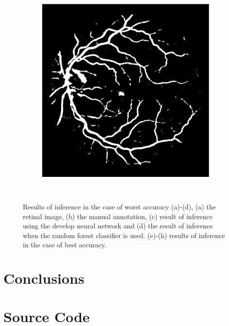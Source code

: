 \documentclass[aps,prb,10pt,twocolumn,groupedaddress]{revtex4-1}
\begin{document}
\begin{figure}[!t]
\begin{subfigure}[]{0.22\textwidth}
		\caption{}
	\end{subfigure}
	\hspace{0.25cm}
	\centering
	\begin{subfigure}[]{0.22\textwidth}
		\centering
		\includegraphics[width=\textwidth]{images/09_test_rf_best_accuracy_94}
		\caption{}
	\end{subfigure}\\
	\caption{Results of inference in the case of worst accuracy (a)-(d), (a) the retinal image, (b) the manual annotation, (c) result of inference using the develop neural network and (d) the result of inference when the random forest classifier is used. (e)-(h) results of inference in the case of best accuracy.}
	\label{fig:result_images}
\end{figure}

\section{Conclusions}
\label{sec:conclusions}




\appendix
\onecolumngrid
\section{Source Code}
\label{appendix:a}
\lstset{language=Python}
\end{document}
